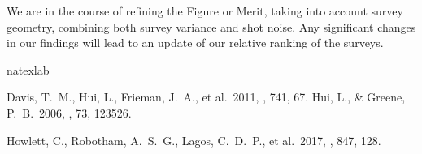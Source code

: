 \documentclass{aastex62}   	%
\begin{document}
We are in the course of refining the Figure or Merit, taking into account survey geometry, combining both survey variance and shot noise.
Any significant changes in our findings will lead to an update of our relative
ranking of the surveys.


\begin{thebibliography}{}
\expandafter\ifx\csname natexlab\endcsname\relax\def\natexlab#1{#1}\fi
\providecommand{\url}[1]{\href{#1}{#1}}
\providecommand{\dodoi}[1]{doi:~\href{http://doi.org/#1}{\nolinkurl{#1}}}
\providecommand{\doeprint}[1]{\href{http://ascl.net/#1}{\nolinkurl{http://ascl.net/#1}}}
\providecommand{\doarXiv}[1]{\href{https://arxiv.org/abs/#1}{\nolinkurl{https://arxiv.org/abs/#1}}}

 Davis, T.~M., Hui, L., Frieman, J.~A., et al.\ 2011, \apj, 741, 67.  
 Hui, L., \& Greene, P.~B.\ 2006, \prd, 73, 123526.
  
 Howlett, C., Robotham, A.~S.~G., Lagos, C.~D.~P., et al.\ 2017, \apj, 847, 128.
\end{thebibliography}

\end{document}
